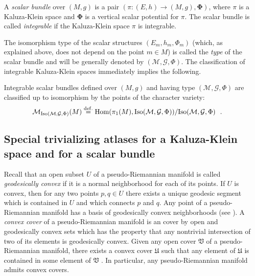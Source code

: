 \documentclass[10pt, cmp, numbook, final, a4paper]{svjour}
\newcommand{\Hom}{{\rm Hom}}
\newcommand{\eqdef}{\stackrel{{\rm def.}}{=}}
\newcommand{\be}{\begin{equation*}}
\newcommand{\ee}{\end{equation*}}
\newcommand{\cM}{\mathcal{M}}
\def\cG{\mathcal{G}}
\def\bPhi{\mathbf{\Phi}}
\def\Iso{\mathrm{Iso}}
\begin{document}
\begin{definition}
A {\em scalar bundle} over $(M,g)$ is a pair $(\pi:(E,h)\rightarrow
(M,g),\bPhi)$, where $\pi$ is a Kaluza-Klein space and $\bPhi$ is a
vertical scalar potential for $\pi$. The scalar bundle is called {\em
integrable} if the Kaluza-Klein space $\pi$ is integrable.
\end{definition}

\noindent 
The isomorphism type of the scalar structures $(E_m,h_m,\Phi_m)$
(which, as explained above, does not depend on the point $m\in M$) is
called the {\em type} of the scalar bundle and will be generally
denoted by $(\cM,\cG,\Phi)$.  The classification of integrable
Kaluza-Klein spaces immediately implies the following.

\begin{proposition}
Integrable scalar bundles defined over $(M,g)$ and having type
$(\cM,\cG,\Phi)$ are classified up to isomorphism by the points of the
character variety:
\be
\cM_{\Iso(\cM,\cG,\Phi)}(M)\eqdef \Hom(\pi_1(M),\Iso(\cM,\cG,\Phi))/\Iso(\cM,\cG,\Phi)~~.
\ee
\end{proposition}

\subsection{Special trivializing atlases for a Kaluza-Klein space and for a scalar bundle}
\label{spectriv}
Recall that an open subset $U$ of a pseudo-Riemannian
manifold is called {\em geodesically convex} \cite{ONeillBook} if it
is a normal neighborhood for each of its points. If $U$ is convex,
then for any two points $p,q\in U$ there exists a unique geodesic
segment which is contained in $U$ and which connects $p$ and $q$.  Any
point of a pseudo-Riemannian manifold has a basis of geodesically
convex neighborhoods (see \cite[p. 129]{ONeillBook}). A {\em convex
  cover} of a pseudo-Riemannian manifold is an cover by open and
geodesically convex sets which has the property that any nontrivial
intersection of two of its elements is geodesically convex. Given
any open cover $\mathfrak{V}$ of a pseudo-Riemannian manifold, there
exists a convex cover $\mathfrak{U}$ such that any element of
$\mathfrak{U}$ is contained in some element of $\mathfrak{V}$
\cite[Lemma 5.10]{ONeillBook}. In particular, any pseudo-Riemannian 
manifold admits convex covers. 
\end{document}
